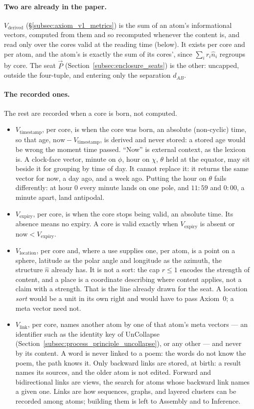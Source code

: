 \documentclass[12pt, a4paper]{article}
\begin{document}
\paragraph{Two are already in the paper.} $V_{\text{derived}}$
(\S\ref{subsec:axiom_v1_metrics}) is the sum of an atom's informational
vectors, computed from them and so recomputed whenever the content is, and read
only over the cores valid at the reading time (below).
It exists per core and per atom, and the atom's is exactly the sum of
its cores', since $\sum_i r_i\hat n_i$ regroups by core. The seat
$\vec P$ (Section~\ref{subsec:enclosure_seats}) is the other: uncapped,
outside the four-tuple, and entering only the separation $d_{AB}$.

\paragraph{The recorded ones.} The rest are recorded when a core is
born, not computed.
\begin{itemize}
\item $V_{\text{timestamp}}$, per core, is when the core was born, an
absolute (non-cyclic) time, so that age, $\text{now}-V_{\text{timestamp}}$,
is derived and never stored: a stored age would be wrong the moment time
passed. ``Now'' is external context, as the lexicon is. A clock-face
vector, minute on $\phi$, hour on $\chi$, $\theta$ held at the equator,
may sit beside it for grouping by time of day. It cannot replace it: it
returns the same vector for now, a day ago, and a week ago. Putting the
hour on $\theta$ fails differently: at hour $0$ every minute lands on one
pole, and $11{:}59$ and $0{:}00$, a minute apart, land antipodal.
\item $V_{\text{expiry}}$, per core, is when the core stops being valid,
an absolute time. Its absence means no expiry. A core is valid exactly
when $V_{\text{expiry}}$ is absent or $\text{now}<V_{\text{expiry}}$.
\item $V_{\text{location}}$, per core and, where a use supplies one, per atom, is a point on a sphere, latitude as the polar
angle and longitude as the azimuth, the structure $\hat n$ already has.
It is not a sort: the cap $r\le1$ encodes the strength of content, and a
place is a coordinate describing where content applies, not a claim with
a strength. That is the line already drawn for the seat. A location
\emph{sort} would be a unit in its own right and would have to pass
Axiom~0; a meta vector need not.
\item $V_{\text{link}}$, per core, names another atom by one of that atom's meta
vectors --- an identifier such as the identity key of UnCollapse (Section~\ref{subsec:process_principle_uncollapse}), or any other --- and never by its content. A word is never
linked to a poem: the words do not know the poem, the path knows it.
Only backward links are stored, at birth: a result names its sources,
and the older atom is not edited. Forward and bidirectional links are
views, the search for atoms whose backward link names a given one. Links
are how sequences, graphs, and layered clusters can be recorded among
atoms; building them is left to Assembly and to Inference.
\end{itemize}
\end{document}
